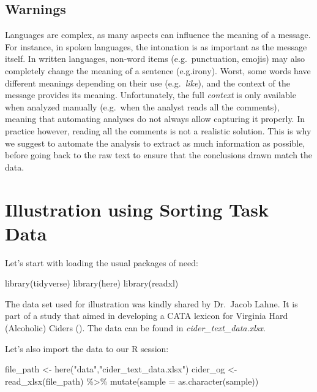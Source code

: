 \documentclass[
]{krantz}
\makeatletter
\newenvironment{Shaded}{\begin{snugshade}}{\end{snugshade}}
\newcommand{\AttributeTok}[1]{\textcolor[rgb]{0.61,0.61,0.61}{#1}}
\newcommand{\FunctionTok}[1]{\textcolor[rgb]{0,0,0}{#1}}
\newcommand{\NormalTok}[1]{#1}
\newcommand{\OtherTok}[1]{\textcolor[rgb]{0.37,0.37,0.37}{#1}}
\newcommand{\SpecialCharTok}[1]{\textcolor[rgb]{0,0,0}{#1}}
\newcommand{\StringTok}[1]{\textcolor[rgb]{0.5,0.5,0.5}{#1}}
\newenvironment{kframe}{%
\medskip{}
\setlength{\fboxsep}{.8em}
 \def\at@end@of@kframe{}%
 \ifinner\ifhmode%
  \def\at@end@of@kframe{\end{minipage}}%
  \begin{minipage}{\columnwidth}%
 \fi\fi%
 \def\FrameCommand##1{\hskip\@totalleftmargin \hskip-\fboxsep
 \colorbox{shadecolor}{##1}\hskip-\fboxsep
     \hskip-\linewidth \hskip-\@totalleftmargin \hskip\columnwidth}%
 \MakeFramed {\advance\hsize-\width
   \@totalleftmargin\z@ \linewidth\hsize
   \@setminipage}}%
 {\par\unskip\endMakeFramed%
 \at@end@of@kframe}
\renewenvironment{Shaded}{\begin{kframe}}{\end{kframe}}
\makeatother
\begin{document}
\hypertarget{warnings}{%
\subsection{Warnings}\label{warnings}}

Languages are complex, as many aspects can influence the meaning of a message. For instance, in spoken languages, the intonation is as important as the message itself. In written languages, non-word items (e.g.~punctuation, emojis) may also completely change the meaning of a sentence (e.g.irony). Worst, some words have different meanings depending on their use (e.g.~\emph{like}), and the context of the message provides its meaning. Unfortunately, the full \emph{context} is only available when analyzed manually (e.g.~when the analyst reads all the comments), meaning that automating analyses do not always allow capturing it properly. In practice however, reading all the comments is not a realistic solution. This is why we suggest to automate the analysis to extract as much information as possible, before going back to the raw text to ensure that the conclusions drawn match the data.

\hypertarget{illustration-using-sorting-task-data}{%
\section{Illustration using Sorting Task Data}\label{illustration-using-sorting-task-data}}

Let's start with loading the usual packages of need:

\begin{Shaded}
\begin{Highlighting}[]
\FunctionTok{library}\NormalTok{(tidyverse)}
\FunctionTok{library}\NormalTok{(here)}
\FunctionTok{library}\NormalTok{(readxl)}
\end{Highlighting}
\end{Shaded}

The data set used for illustration was kindly shared by Dr.~Jacob Lahne. It is part of a study that aimed in developing a CATA lexicon for Virginia Hard (Alcoholic) Ciders (\citet{Phetxumphou2020}). The data can be found in \emph{cider\_text\_data.xlsx}.

Let's also import the data to our R session:

\begin{Shaded}
\begin{Highlighting}[]
\NormalTok{file\_path }\OtherTok{\textless{}{-}} \FunctionTok{here}\NormalTok{(}\StringTok{"data"}\NormalTok{,}\StringTok{"cider\_text\_data.xlsx"}\NormalTok{) }
\NormalTok{cider\_og }\OtherTok{\textless{}{-}} \FunctionTok{read\_xlsx}\NormalTok{(file\_path) }\SpecialCharTok{\%\textgreater{}\%} 
  \FunctionTok{mutate}\NormalTok{(}\AttributeTok{sample =} \FunctionTok{as.character}\NormalTok{(sample))}
\end{Highlighting}
\end{Shaded}
\end{document}
